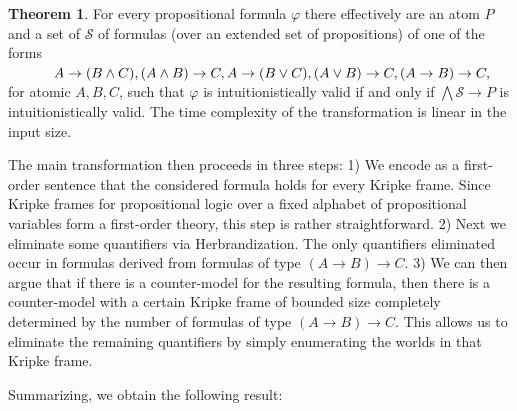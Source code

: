 \documentclass[a4paper,11pt]{report}
\theoremstyle{definition}
\newtheorem{theorem}{Theorem}[section]
\theoremstyle{definition}
\theoremstyle{definition}
\theoremstyle{definition}
\theoremstyle{definition}
\theoremstyle{definition}
\theoremstyle{definition}
\begin{document}
	\begin{theorem}\label{thm:Tseytin1}
		For every propositional formula $\varphi$ there effectively are an atom $P$ and a set of $\mathcal S$ of formulas (over an extended set of propositions) of one of the forms\\
		$\text{ \hspace{1cm}} A\to (B\wedge C), (A\wedge B)\to C, A\to (B\vee C), (A\vee B)\to C, (A\to B)\to C,$\\
		for atomic $A, B, C$, such that $\varphi$ is intuitionistically valid if and only if $\bigwedge\mathcal S\to P$ is intuitionistically valid. The time complexity of the transformation is linear in the input size.
	\end{theorem}
	
	The main transformation then proceeds in three steps:
	1) We encode as a first-order sentence that the considered formula holds for every Kripke frame.
	Since Kripke frames for propositional logic over a fixed alphabet of propositional variables form a first-order theory, this step is rather straightforward.
	2) Next we eliminate some quantifiers via Herbrandization. The only quantifiers eliminated occur in formulas derived from formulas of type $(A\to B)\to C$.
	3) We can then argue that if there is a counter-model for the resulting formula, then there is a counter-model with a certain Kripke frame of bounded size completely determined by the number of formulas of type $(A\to B)\to C$.
	This allows us to eliminate the remaining quantifiers by simply enumerating the worlds in that Kripke frame.
	
	Summarizing, we obtain the following result:
	
\end{document}
